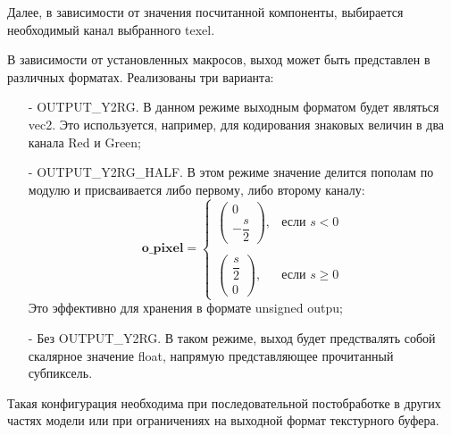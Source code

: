 \documentclass[a4paper,14pt]{extreport}
\begin{document}
            Далее, в зависимости от значения посчитанной компоненты, выбирается необходимый канал выбранного texel.
            
            
            В зависимости от установленных макросов, выход может быть представлен в различных форматах. Реализованы три варианта:
            \begin{itemize}
                \item[-] OUTPUT\_Y2RG. В данном режиме выходным форматом будет являться vec2. Это используется, например, для кодирования знаковых величин в два канала Red и Green;
                \item[-] OUTPUT\_Y2RG\_HALF. В этом режиме значение делится пополам по модулю и присваивается либо первому, либо второму каналу:
                \begin{equation}
                \mathbf{o\_pixel} =
                \begin{cases}
                \begin{pmatrix}
                0 \\
                -\dfrac{s}{2}
                \end{pmatrix}, & \text{если } s < 0 \\
                \\
                \begin{pmatrix}
                \dfrac{s}{2} \\
                0
                \end{pmatrix}, & \text{если } s \geq 0
                \end{cases}
                \end{equation}
                Это эффективно для хранения в формате unsigned outpu;
                \item[-] Без OUTPUT\_Y2RG. В таком режиме, выход будет предствалять собой скалярное значение float, напрямую представляющее прочитанный субпиксель.
            \end{itemize}
            
            Такая конфигурация необходима при последовательной постобработке в других частях модели или при ограничениях на выходной формат текстурного буфера.
    
\end{document}
